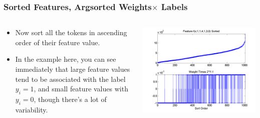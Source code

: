\documentclass{beamer}
\begin{document}
\begin{frame}
  \frametitle{Sorted Features, Argsorted Weights$\times$ Labels}
  \begin{columns}
    \begin{column}{0.4\textwidth}
      \begin{itemize}
        \item 
          Now sort all the tokens in ascending order of their feature value.
        \item
          In the example here, you can see immediately that large
          feature values tend to be associated with the label $y_i=1$,
          and small feature values with $y_i=0$, though there's a lot
          of variability.
      \end{itemize}
    \end{column}
    \begin{column}{0.6\textwidth}
      \centerline{\includegraphics[width=\textwidth]{figs/features_weightslabels_sorted.png}}
    \end{column}
  \end{columns}
\end{frame}
\end{document}
